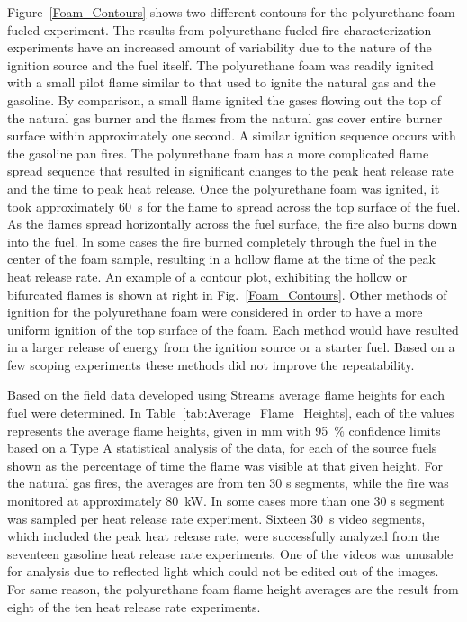 \documentclass[twoside]{uocthesis}
\begin{document}
{{Figure~\ref{Foam_Contours} shows two different contours for the polyurethane foam fueled experiment.  The results from polyurethane fueled fire characterization experiments have an increased amount of variability due to the nature of the ignition source and the fuel itself.  The polyurethane foam was readily ignited with a small pilot flame similar to that used to ignite the natural gas and the gasoline.  By comparison, a small flame ignited the gases flowing out the top of the natural gas burner and the flames from the natural gas cover entire burner surface within approximately one second.  A similar ignition sequence occurs with the gasoline pan fires. The polyurethane foam has a more complicated flame spread sequence that resulted in significant changes to the peak heat release rate and the time to peak heat release.  Once the polyurethane foam was ignited, it took approximately 60~s for the flame to spread across the top surface of the fuel.  As the flames spread horizontally across the fuel surface, the fire also burns down into the fuel.  In some cases the fire burned completely through the fuel in the center of the foam sample, resulting in a hollow flame at the time of the peak heat release rate.  An example of a contour plot, exhibiting the hollow or bifurcated flames is shown at right in Fig.~\ref{Foam_Contours}.  Other methods of ignition for the polyurethane foam were considered in order to have a more uniform ignition of the top surface of the foam.  Each method would have resulted in a larger release of energy from the ignition source or a starter fuel.   Based on a few scoping experiments these methods did not improve the repeatability.

Based on the field data developed using Streams average flame heights for each fuel were determined.  In Table~\ref{tab:Average_Flame_Heights}, each of the values represents the average flame heights, given in mm with 95~\% confidence limits based on a Type A statistical analysis of the data, for each of the source fuels shown as the percentage of time the flame was visible at that given height.  For the natural gas fires, the averages are from ten 30 s segments, while the fire was monitored at approximately 80~kW.  In some cases more than one 30 s segment was sampled per heat release rate experiment.  Sixteen 30~s video segments, which included the peak heat release rate, were successfully analyzed from the seventeen gasoline heat release rate experiments.  One of the videos was unusable for analysis due to reflected light which could not be edited out of the images.  For same reason, the polyurethane foam flame height averages are the result from eight of the ten heat release rate experiments.

}}
\end{document}
